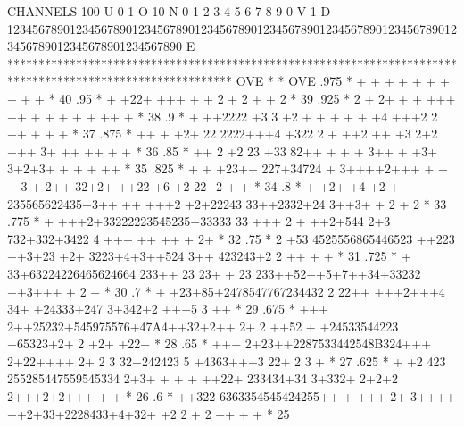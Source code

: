 \begin{Listing}
 CHANNELS 100 U 0                                                                                                  1 O 
           10 N 0        1         2         3         4         5         6         7         8         9         0 V 
            1 D 1234567890123456789012345678901234567890123456789012345678901234567890123456789012345678901234567890 E 
            ************************************************************************************************************
   OVE      *                                                                                                          * OVE
      .975  *                       +         +    +                         +          +     + +     + +  +           *  40
      .95   *                           +  +22+ +++     +  +            2 + 2              +   +     2                 *  39
      .925  *                       2 +  2+ +   + +++ ++     +               +    + +      +  ++     +                 *  38
      .9    *                 +       ++2222 +3  3    +2      + +       + + + +4   +++2 2     ++ +   +  +              *  37
      .875  *                  ++ + +2+ 22 2222+++4 +322  2  +     ++2   ++ +3 2+2    +++    3+ ++ ++   +        +     *  36
      .85   *                 ++   2 +2 23 +33 82++  + +       +      3++ +   +3+ 3+2+3+ +   +      +     ++           *  35
      .825  *                + +  +23++ 227+34724 + 3++++2+++ + +  + 3  +   2++ 32+2+ ++22 +6 +2  22+2     +     +     *  34
      .8    *              +  +2+  +4 +2 + 235565622435+3++    ++ +++2 +2+22243 33++2332+24 3++3+ + 2  +     2         *  33
      .775  *           +     +++2+33222223545235+33333 33 +++  2  +  ++2+544 2+3 732+332+3422 4  +++ ++ ++  + 2+      *  32
      .75   *                    2 +53 4525556865446523 ++223  ++3+23 +2+ 3223+4+3++524 3++ 423243+2 2 ++ +       +    *  31
      .725  *                   + 33+63224226465624664 233++  23 23+ + 23 233++52++5+7++34+33232  ++3+++ +  2 +        *  30
      .7    *             +      +23+85+2478547767234432 2 22++ +++2+++4  34+ +24333+247   3+342+2 +++5 3   ++         *  29
      .675  *               +++ 2++25232+545975576+47A4++32+2++ 2+ 2  ++52 + +24533544223 +65323+2+ 2  +2+  +22+       *  28
      .65   *             +++  2+23++2287533442548B324+++ 2+22++++  2+ 2   3 32+242423 5 +4363+++3  22+ 2  3      +    *  27
      .625  *              + +2  423 255285447559545334 2+3+ + +    + ++22+ 233434+34 3+332+ 2+2+2 2+++2+2+++  + +     *  26
      .6    *                     ++322 6363354545424255++ + +++ 2+ 3++++ ++2+33+2228433+4+32+ +2 2   +  2    ++ + +   *  25

\end{Listing}

